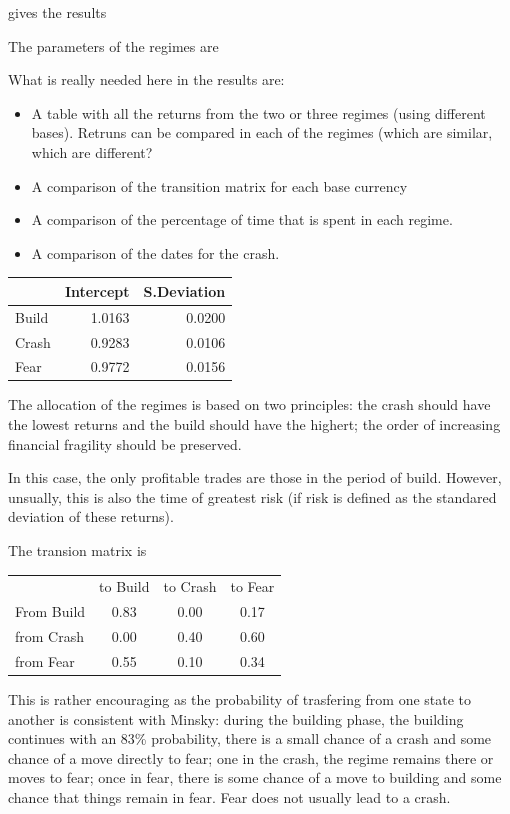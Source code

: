 \documentclass[12pt, a4paper, oneside]{article} %
\begin{document}
gives the results
 
 
The parameters of the regimes are 
 
What is really needed here in the results are:
\begin{itemize}
\item A table with all the returns from the two or three regimes (using different bases).  Retruns can be compared in each of the regimes (which are similar, which are different? 
\item A comparison of the transition matrix for each base currency
\item A comparison of the percentage of time that is spent in each regime. 
\item A comparison of the dates for the crash. 
\end{itemize}
 
\begin{centering}
\begin{tabular}{l r r}
& Intercept & S.Deviation\\
\hline
Build & 1.0163 & 0.0200\\
Crash & 0.9283 & 0.0106\\
Fear & 0.9772 & 0.0156
\end{tabular}
\end{centering}
  
The allocation of the regimes is based on two principles:  the crash should have the lowest returns and the build should have the highert; the order of increasing financial fragility should be preserved.  

In this case, the only profitable trades are those in the period of build.  However, unsually, this is also the time of greatest risk (if risk is defined as the standared deviation of these returns).  

The transion matrix is 

 \begin{centering}
 \begin{tabular}{l c c c}
 & to Build & to Crash & to Fear\\
 From Build & 0.83 & 0.00 & 0.17\\
 from Crash & 0.00 & 0.40 & 0.60\\
 from Fear & 0.55 & 0.10 & 0.34
 \end{tabular}
 \end{centering}

This is rather encouraging as the probability of trasfering from one state to another is consistent with Minsky:  during the building phase, the building continues with an 83\% probability, there is a small chance of a crash and some chance of a move directly to fear; one in the crash, the regime remains there or moves to fear; once in fear, there is some chance of a move to building and some chance that things remain in fear.  Fear does not usually lead to a crash. 
\end{document}
